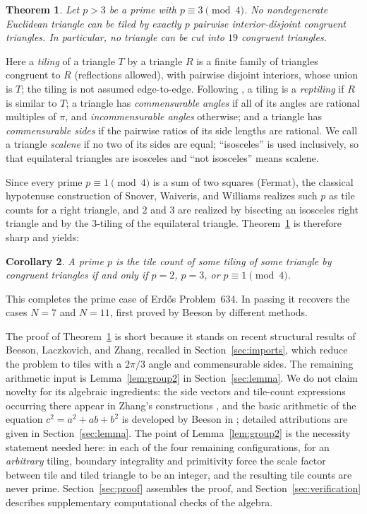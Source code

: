 \documentclass[11pt]{amsart}
\newtheorem{theorem}{Theorem}
\newtheorem{corollary}[theorem]{Corollary}
\theoremstyle{remark}
\begin{document}
\begin{theorem}\label{thm:main}
Let $p>3$ be a prime with $p\equiv 3\pmod 4$. No nondegenerate Euclidean triangle can be tiled by exactly $p$ pairwise interior-disjoint congruent triangles. In particular, no triangle can be cut into $19$ congruent triangles.
\end{theorem}

Here a \emph{tiling} of a triangle $T$ by a triangle $R$ is a finite family of triangles congruent to $R$ (reflections allowed), with pairwise disjoint interiors, whose union is $T$; the tiling is not assumed edge-to-edge. Following \cite{BLZ633}, a tiling is a \emph{reptiling} if $R$ is similar to $T$; a triangle has \emph{commensurable angles} if all of its angles are rational multiples of $\pi$, and \emph{incommensurable angles} otherwise; and a triangle has \emph{commensurable sides} if the pairwise ratios of its side lengths are rational. We call a triangle \emph{scalene} if no two of its sides are equal; ``isosceles'' is used inclusively, so that equilateral triangles are isosceles and ``not isosceles'' means scalene.

Since every prime $p\equiv 1\pmod 4$ is a sum of two squares (Fermat), the classical hypotenuse construction of Snover, Waiveris, and Williams \cite{SWW91} realizes such $p$ as tile counts for a right triangle, and $2$ and $3$ are realized by bisecting an isosceles right triangle and by the $3$-tiling of the equilateral triangle. Theorem~\ref{thm:main} is therefore sharp and yields:

\begin{corollary}\label{cor:primes}
A prime $p$ is the tile count of some tiling of some triangle by congruent triangles if and only if $p=2$, $p=3$, or $p\equiv 1\pmod 4$.
\end{corollary}

This completes the prime case of Erd\H{o}s Problem~634. In passing it recovers the cases $N=7$ and $N=11$, first proved by Beeson \cite{Beeson7} by different methods.

The proof of Theorem~\ref{thm:main} is short because it stands on recent structural results of Beeson, Laczkovich, and Zhang, recalled in Section~\ref{sec:imports}, which reduce the problem to tiles with a $2\pi/3$ angle and commensurable sides. The remaining arithmetic input is Lemma~\ref{lem:group2} in Section~\ref{sec:lemma}. We do not claim novelty for its algebraic ingredients: the side vectors and tile-count expressions occurring there appear in Zhang's constructions \cite{Zhang25}, and the basic arithmetic of the equation $c^2=a^2+ab+b^2$ is developed by Beeson in \cite{BeesonPrime}; detailed attributions are given in Section~\ref{sec:lemma}. The point of Lemma~\ref{lem:group2} is the necessity statement needed here: in each of the four remaining configurations, for an \emph{arbitrary} tiling, boundary integrality and primitivity force the scale factor between tile and tiled triangle to be an integer, and the resulting tile counts are never prime. Section~\ref{sec:proof} assembles the proof, and Section~\ref{sec:verification} describes supplementary computational checks of the algebra.
\end{document}
